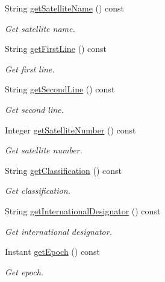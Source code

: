 \begin{DoxyCompactItemize}
String \hyperlink{classostk_1_1astro_1_1trajectory_1_1orbit_1_1models_1_1sgp4_1_1_t_l_e_a3cd38e40cec168239029eeec5bc57c23}{get\+Satellite\+Name} () const
\begin{DoxyCompactList}\small\item\em Get satellite name. \end{DoxyCompactList}\item 
String \hyperlink{classostk_1_1astro_1_1trajectory_1_1orbit_1_1models_1_1sgp4_1_1_t_l_e_ace656b8df665ed4ba7accb0adb6fd629}{get\+First\+Line} () const
\begin{DoxyCompactList}\small\item\em Get first line. \end{DoxyCompactList}\item 
String \hyperlink{classostk_1_1astro_1_1trajectory_1_1orbit_1_1models_1_1sgp4_1_1_t_l_e_a6f1f60f662a1891ce93576344989502a}{get\+Second\+Line} () const
\begin{DoxyCompactList}\small\item\em Get second line. \end{DoxyCompactList}\item 
Integer \hyperlink{classostk_1_1astro_1_1trajectory_1_1orbit_1_1models_1_1sgp4_1_1_t_l_e_a63c9241a31234dd07ee4ca4424a9df5f}{get\+Satellite\+Number} () const
\begin{DoxyCompactList}\small\item\em Get satellite number. \end{DoxyCompactList}\item 
String \hyperlink{classostk_1_1astro_1_1trajectory_1_1orbit_1_1models_1_1sgp4_1_1_t_l_e_aacb1592d95371a826ea41058f4ee6936}{get\+Classification} () const
\begin{DoxyCompactList}\small\item\em Get classification. \end{DoxyCompactList}\item 
String \hyperlink{classostk_1_1astro_1_1trajectory_1_1orbit_1_1models_1_1sgp4_1_1_t_l_e_a74fae03332b1bf5514c0850125b5c115}{get\+International\+Designator} () const
\begin{DoxyCompactList}\small\item\em Get international designator. \end{DoxyCompactList}\item 
Instant \hyperlink{classostk_1_1astro_1_1trajectory_1_1orbit_1_1models_1_1sgp4_1_1_t_l_e_a2c3580e644158b56b14868137585a73d}{get\+Epoch} () const
\begin{DoxyCompactList}\small\item\em Get epoch. \end{DoxyCompactList}\item 

\end{DoxyCompactItemize}
